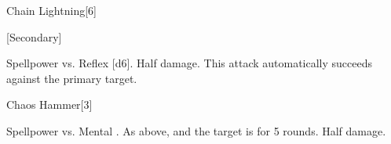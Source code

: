 \begin{spellsection}{Chain Lightning}[6]
    \begin{spellheader}
    \end{spellheader}
    \begin{spellcontent}
        \begin{spelltargetinginfo}
            [Secondary]
        \end{spelltargetinginfo}
        \begin{spelleffects}
            \begin{spellattack}{Spellpower vs. Reflex}
                \spellsuccess {}[d6].
                \spellfailure Half damage.
                \spellspecial This attack automatically succeeds against the primary target.
            \end{spellattack}
        \end{spelleffects}
    \end{spellcontent}
    \begin{spellfooter}
        \miscastexplode
    \end{spellfooter}
\end{spellsection}

\begin{spellsection}{Chaos Hammer}[3]
    \begin{spellheader}
    \end{spellheader}
    \begin{spellcontent}
        \begin{spelltargetinginfo}
        \end{spelltargetinginfo}
        \begin{spelleffects}
            \begin{spellattack}{Spellpower vs. Mental}
                \spellsuccess {}.
                \spellcritical As above, and the target is \disoriented for 5 rounds.
                \spellfailure Half damage.
            \end{spellattack}
        \end{spelleffects}
    \end{spellcontent}
    \begin{spellfooter}
        \miscastrandom
    \end{spellfooter}
\end{spellsection}

